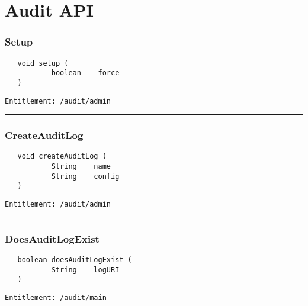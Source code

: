\chapter{Audit API}

\subsection{Setup}
\label{Api:Setup}
\begin{Verbatim}
   void setup (
           boolean    force
   )
\end{Verbatim}
\begin{Verbatim}[formatcom=\color{Maroon}]
  Entitlement: /audit/admin
\end{Verbatim}



\rule{12cm}{2pt}
\subsection{CreateAuditLog}
\label{Api:CreateAuditLog}
\begin{Verbatim}
   void createAuditLog (
           String    name
           String    config
   )
\end{Verbatim}
\begin{Verbatim}[formatcom=\color{Maroon}]
  Entitlement: /audit/admin
\end{Verbatim}



\rule{12cm}{2pt}
\subsection{DoesAuditLogExist}
\label{Api:DoesAuditLogExist}
\begin{Verbatim}
   boolean doesAuditLogExist (
           String    logURI
   )
\end{Verbatim}
\begin{Verbatim}[formatcom=\color{Maroon}]
  Entitlement: /audit/main
\end{Verbatim}



